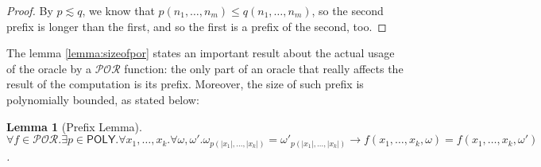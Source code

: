 \documentclass[10pt]{amsart}
\newcommand{\POLY}{\mathsf{POLY}}
\newcommand{\POR}{\mathcal{POR}}
\newcommand{\vone}{x}
\newcommand{\oone}{\omega}
\newtheorem{lemma}{Lemma}
\begin{document}
\begin{proof}
By $p \lesssim q$, we know that $p(n_1, \ldots, n_m)\le q(n_1, \ldots, n_m)$, so the second prefix is longer than the first, and so the first is a prefix of the second, too.
\end{proof}

The lemma \ref{lemma:sizeofpor} states an important result about the actual usage of the oracle by a $\POR$ function: the only part of an oracle that really affects the result of the computation is its prefix. Moreover, the size of such prefix is polynomially bounded, as stated below:

\begin{lemma}[Prefix Lemma]
\label{lemma:oraclebound}
$\forall f \in \POR. \exists p \in \POLY. \forall \vone_1, \ldots, \vone_k.\forall \oone, \oone'. \oone_{p(|\vone_1|, \ldots, |\vone_k|)}=\oone'_{p(|\vone_1|, \ldots, |\vone_k|)} \to f(\vone_1, \ldots, \vone_k,\oone)=f(\vone_1, \ldots, \vone_k,\oone')$.
\end{lemma}
\end{document}
